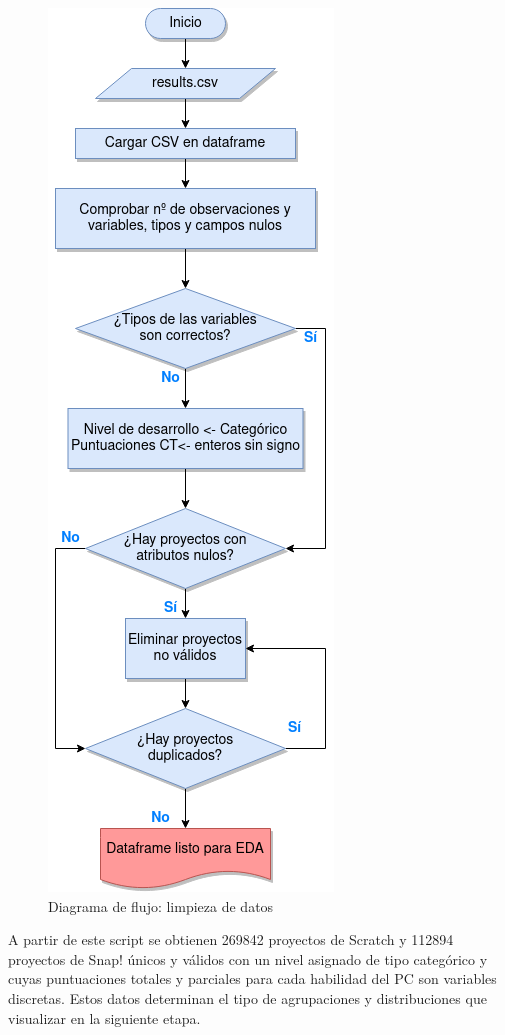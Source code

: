 \documentclass[a4paper, 12pt]{book}
\begin{document}
\begin{figure}[ht]
    \centering
    \includegraphics[height=.6\textheight]{img/script_clean2.png}
    \caption{Diagrama de flujo: limpieza de datos}\label{fig:script_clean}
\end{figure}

A partir de este script se obtienen 269842 proyectos de Scratch y 112894 proyectos de Snap! únicos y válidos con un nivel asignado de tipo categórico y cuyas puntuaciones totales y parciales para cada habilidad del PC son variables discretas. Estos datos determinan el tipo de agrupaciones y distribuciones que visualizar en la siguiente etapa.
\end{document}
